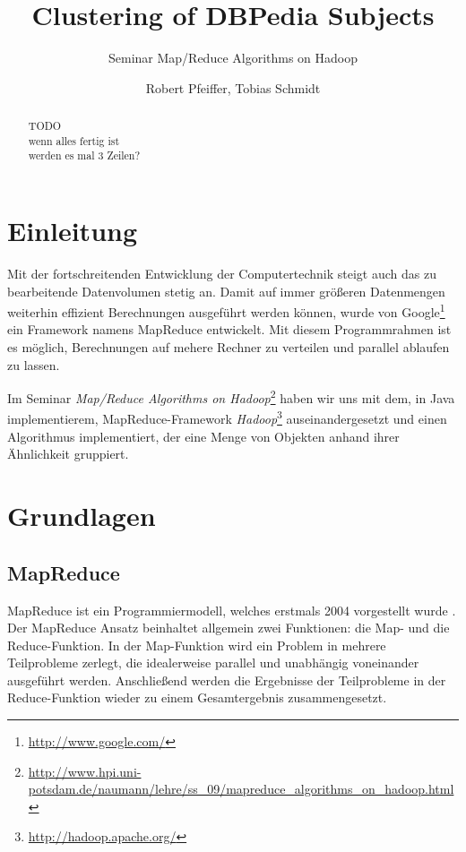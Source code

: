 \documentclass[a4paper]{llncs}
\begin{document}
\title{Clustering of DBPedia Subjects}
\subtitle{Seminar Map/Reduce Algorithms on Hadoop}
\author{Robert Pfeiffer, Tobias Schmidt}

\maketitle

\begin{abstract}
TODO\\
wenn alles fertig ist\\
werden es mal 3 Zeilen?
\end{abstract}

\section{Einleitung}
Mit der fortschreitenden Entwicklung der Computertechnik steigt auch das zu bearbeitende Datenvolumen stetig an. Damit auf immer größeren Datenmengen weiterhin effizient Berechnungen ausgeführt werden können, wurde von Google\footnote{\url{http://www.google.com/}} ein Framework namens MapReduce entwickelt. Mit diesem Programmrahmen ist es möglich, Berechnungen auf mehere Rechner zu verteilen und parallel ablaufen zu lassen.

Im Seminar \emph{Map/Reduce Algorithms on Hadoop}\footnote{\url{http://www.hpi.uni-potsdam.de/naumann/lehre/ss_09/mapreduce_algorithms_on_hadoop.html}} haben wir uns mit dem, in Java implementierem, MapReduce-Framework \emph{Hadoop}\footnote{\url{http://hadoop.apache.org/}} auseinandergesetzt und einen Algorithmus implementiert, der eine Menge von Objekten anhand ihrer Ähnlichkeit gruppiert.

\section{Grundlagen}

\subsection{MapReduce}
MapReduce ist ein Programmiermodell, welches erstmals 2004 vorgestellt wurde \cite{DG04}.
Der MapReduce Ansatz beinhaltet allgemein zwei Funktionen: die Map- und die Reduce-Funktion. In der Map-Funktion wird ein Problem in mehrere Teilprobleme zerlegt, die idealerweise parallel und unabhängig voneinander ausgeführt werden. Anschließend werden die Ergebnisse der Teilprobleme in der Reduce-Funktion wieder zu einem Gesamtergebnis zusammengesetzt.
\end{document}
